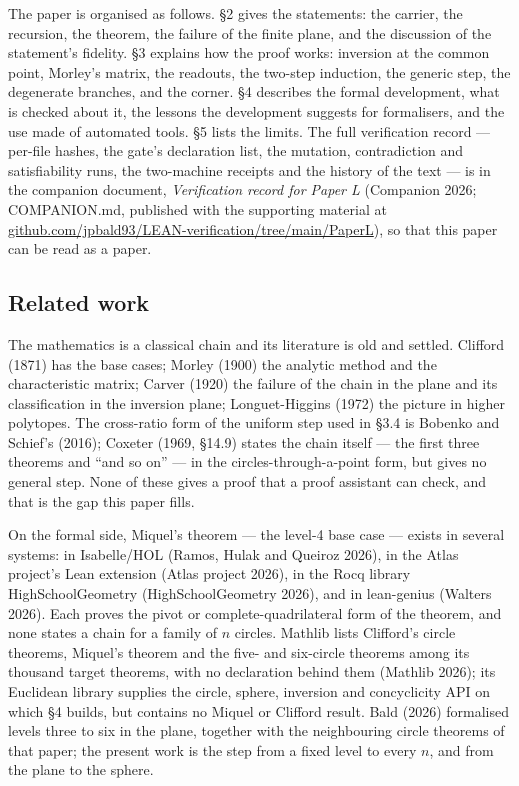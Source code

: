 \documentclass[11pt]{article}
\theoremstyle{definition}
\theoremstyle{remark}
\begin{document}
The paper is organised as follows. \S{}2 gives the statements: the carrier, the recursion, the theorem, the
failure of the finite plane, and the discussion of the statement's fidelity. \S{}3 explains how the proof
works: inversion at the common point, Morley's matrix, the readouts, the two-step induction, the generic
step, the degenerate branches, and the corner. \S{}4 describes the formal development, what is checked about
it, the lessons the development suggests for formalisers, and the use made of automated tools. \S{}5 lists
the limits. The full verification record --- per-file hashes, the gate's declaration list, the mutation,
contradiction and satisfiability runs, the two-machine receipts and the history of the text --- is in the
companion document, \emph{Verification record for Paper L} (Companion 2026; COMPANION.md, published with the
supporting material at
\href{https://github.com/jpbald93/LEAN-verification/tree/main/PaperL}{github.com/jpbald93/LEAN-verification/tree/main/PaperL}),
so that this paper can be read as a paper.

\hypertarget{related-work}{%
\subsection{Related work}\label{related-work}}

The mathematics is a classical chain and its literature is old and settled. Clifford (1871) has the base
cases; Morley (1900) the analytic method and the characteristic matrix; Carver (1920) the failure of the
chain in the plane and its classification in the inversion plane; Longuet-Higgins (1972) the picture in
higher polytopes. The cross-ratio form of the uniform step used in \S{}3.4 is Bobenko and Schief's (2016);
Coxeter (1969, \S{}14.9) states the chain itself --- the first three theorems and ``and so on'' --- in the
circles-through-a-point form, but gives no general step. None of these gives a proof that a proof
assistant can check, and that is the gap this paper fills.

On the formal side, Miquel's theorem --- the level-4 base case --- exists in several systems: in Isabelle/HOL
(Ramos, Hulak and Queiroz 2026), in the Atlas project's Lean extension (Atlas project 2026), in the Rocq
library HighSchoolGeometry (HighSchoolGeometry 2026), and in lean-genius (Walters 2026). Each proves the
pivot or complete-quadrilateral form of the theorem, and none states a chain for a family of \(n\) circles.
Mathlib lists Clifford's circle theorems, Miquel's theorem and the five- and six-circle theorems among
its thousand target theorems, with no declaration behind them (Mathlib 2026); its Euclidean library
supplies the circle, sphere, inversion and concyclicity API on which \S{}4 builds, but contains no Miquel or
Clifford result. Bald (2026) formalised levels three to six in the plane, together with the neighbouring
circle theorems of that paper; the present work is the step from a fixed level to every \(n\), and from the
plane to the sphere.
\end{document}
